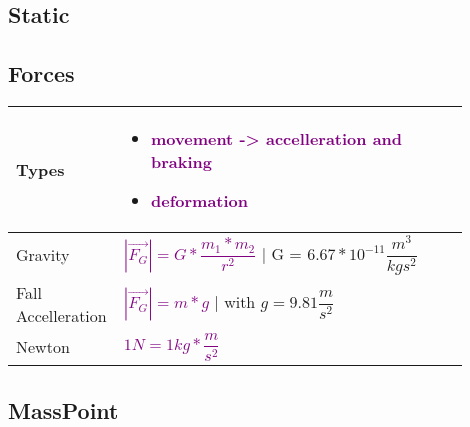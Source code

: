 \documentclass[main.tex,fontsize=8pt,paper=a4,paper=portrait,DIV=calc,]{scrartcl}
\begin{document}
\begin{multicols}{2}
\section{Static}
\subsection{Forces}
\begin{tabular}{|m{0.15\linewidth}|m{0.75\linewidth}|}
\hline
Types  &
\vspace{2mm}
\begin{itemize}
\item \textcolor{purple}{movement -> accelleration and braking}
\item \textcolor{purple}{deformation}
\vspace{-3mm}
\end{itemize}\\ 
\hline
Gravity & 
\textcolor{purple}{\( |\vec{F_G}| = G * \dfrac{m_1 * m_2}{r^2} \)} | 
G = \(6.67 * 10^{-11}\dfrac{m^3}{kgs^2}\)\vspace{2mm}\\
\hline
Fall Accelleration & 
\textcolor{purple}{\(|\vec{F_G}| = m * g\)} | with \(g = 9.81\dfrac{m}{s^2}\)
\\
\hline
Newton & 
\textcolor{purple}{\(1N = 1kg * \dfrac{m}{s^2}\)}\vspace{2mm}
\\
\hline
\end{tabular}
\subsection{MassPoint}
\begin{tabular}{|m{0.15\linewidth}|m{0.75\linewidth}|}
\hline

\hline

\hline

\hline

\hline

\hline
\end{tabular}
\end{multicols}
\pagebreak
\end{document}
